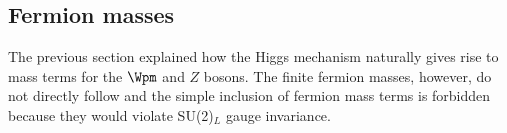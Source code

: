 
\subsection{Fermion masses}
\label{subsec:fermion-masses}
The previous section explained how the Higgs mechanism naturally gives rise to mass terms for the $\Wpm$ and $Z$ bosons. The finite fermion masses, however, do not directly follow and the simple inclusion of fermion mass terms is forbidden because they would violate SU(2)$_L$ gauge invariance.

